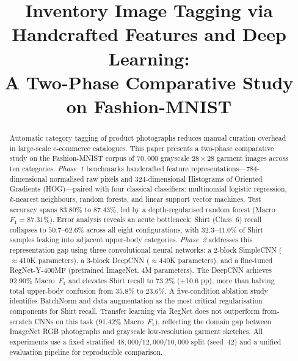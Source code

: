 \documentclass[conference]{IEEEtran}
\begin{document}
\title{Inventory Image Tagging via Handcrafted Features and Deep Learning:\\
A Two-Phase Comparative Study on Fashion-MNIST}

\author{%
}

\maketitle

\begin{abstract}
Automatic category tagging of product photographs reduces manual curation
overhead in large-scale e-commerce catalogues. This paper presents a
two-phase comparative study on the Fashion-MNIST corpus of $70{,}000$
grayscale $28\times28$ garment images across ten categories. \emph{Phase~1}
benchmarks handcrafted feature representations---$784$-dimensional
normalised raw pixels and $324$-dimensional Histograms of Oriented Gradients
(HOG)---paired with four classical classifiers: multinomial logistic
regression, $k$-nearest neighbours, random forests, and linear support
vector machines. Test accuracy spans $83.80\%$ to $87.43\%$, led by a
depth-regularised random forest (Macro~$F_1 = 87.31\%$). Error analysis
reveals an acute bottleneck: Shirt (Class~6) recall collapses to
$50.7$--$62.6\%$ across all eight configurations, with $32.3$--$41.0\%$
of Shirt samples leaking into adjacent upper-body categories.
\emph{Phase~2} addresses this representation gap using three convolutional
neural networks: a 2-block SimpleCNN (${\approx}$410K parameters), a
3-block DeepCNN (${\approx}$440K parameters), and a fine-tuned
RegNet-Y-400MF (pretrained ImageNet, 4M parameters). The DeepCNN achieves
$92.90\%$ Macro~$F_1$ and elevates Shirt recall to $73.2\%$ (+10.6 pp),
more than halving total upper-body confusion from $35.8\%$ to $23.6\%$.
A five-condition ablation study identifies BatchNorm and data augmentation
as the most critical regularisation components for Shirt recall. Transfer
learning via RegNet does not outperform from-scratch CNNs on this task
($91.42\%$ Macro~$F_1$), reflecting the domain gap between ImageNet RGB
photographs and grayscale low-resolution garment sketches. All experiments
use a fixed stratified $48{,}000/12{,}000/10{,}000$ split (seed~42) and
a unified evaluation pipeline for reproducible comparison.
\end{abstract}
\end{document}
